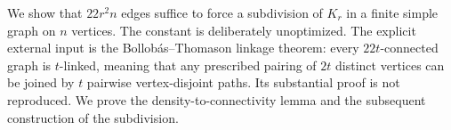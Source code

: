 We show that $22r^2n$ edges suffice to force a subdivision of $K_r$ in a finite simple graph on $n$ vertices. The constant is deliberately unoptimized.
The explicit external input is the Bollob\'as--Thomason linkage theorem: every $22t$-connected graph is $t$-linked, meaning that any prescribed pairing of $2t$ distinct vertices can be joined by $t$ pairwise vertex-disjoint paths. Its substantial proof is not reproduced. We prove the density-to-connectivity lemma and the subsequent construction of the subdivision.
